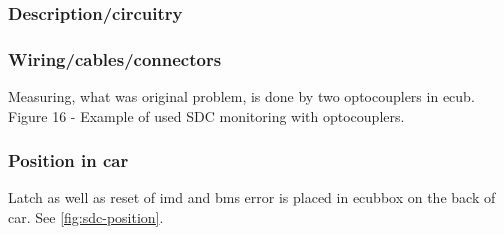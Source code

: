 \subsubsection{Description/circuitry}

\subsubsection{Wiring/cables/connectors}
\iffalse Describe wiring, show schematics, describe connectors and cables used and show useful data regarding the wiring.  If not detailed in section 2.1, be sure to show how the device opens the shutdown circuit.\fi
Measuring, what was original problem, is done by two optocouplers in \gls{ecub}. Figure 16 - Example of used SDC monitoring with optocouplers.
\subsubsection{Position in car}
Latch as well as reset of \gls{imd} and \gls{bms} error is placed in \gls{ecub}box on the back of car. See \ref{fig:sdc-position}.